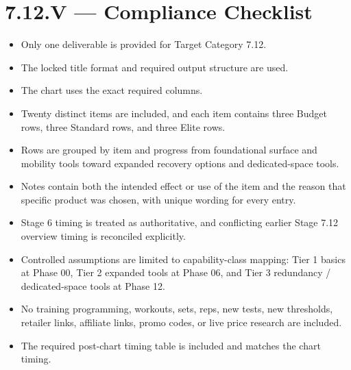 \documentclass[10pt]{article}
\begin{document}
\begin{landscape}
\endgroup

\end{landscape}
\clearpage

\section*{7.12.V — Compliance Checklist}
{}

\begin{itemize}
\item Only one deliverable is provided for Target Category 7.12.
\item The locked title format and required output structure are used.
\item The chart uses the exact required columns.
\item Twenty distinct items are included, and each item contains three Budget rows, three Standard rows, and three Elite rows.
\item Rows are grouped by item and progress from foundational surface and mobility tools toward expanded recovery options and dedicated-space tools.
\item Notes contain both the intended effect or use of the item and the reason that specific product was chosen, with unique wording for every entry.
\item Stage 6 timing is treated as authoritative, and conflicting earlier Stage 7.12 overview timing is reconciled explicitly.
\item Controlled assumptions are limited to capability-class mapping: Tier 1 basics at Phase 00, Tier 2 expanded tools at Phase 06, and Tier 3 redundancy / dedicated-space tools at Phase 12.
\item No training programming, workouts, sets, reps, new tests, new thresholds, retailer links, affiliate links, promo codes, or live price research are included.
\item The required post-chart timing table is included and matches the chart timing.
\end{itemize}
\end{document}
